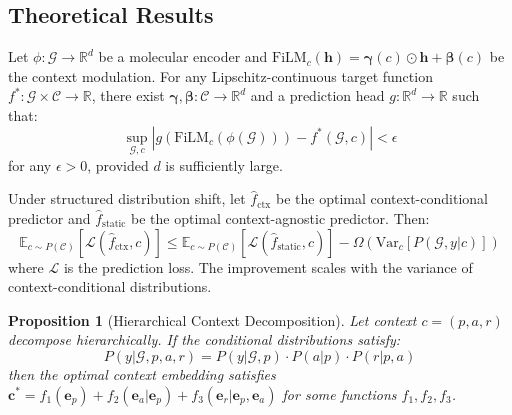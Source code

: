 \documentclass[sigconf,anonymous]{acmart}
\newtheorem{proposition}[theorem]{Proposition}
\begin{document}
\subsection{Theoretical Results}

\begin{theorem}
\label{thm:expressiveness}
Let $\phi: \mathcal{G} \rightarrow \mathbb{R}^d$ be a molecular encoder and $\text{FiLM}_c(\mathbf{h}) = \boldsymbol{\gamma}(c) \odot \mathbf{h} + \boldsymbol{\beta}(c)$ be the context modulation. For any Lipschitz-continuous target function $f^*: \mathcal{G} \times \mathcal{C} \rightarrow \mathbb{R}$, there exist $\boldsymbol{\gamma}, \boldsymbol{\beta}: \mathcal{C} \rightarrow \mathbb{R}^d$ and a prediction head $g: \mathbb{R}^d \rightarrow \mathbb{R}$ such that:
\begin{equation}
    \sup_{\mathcal{G}, c} \left| g(\text{FiLM}_c(\phi(\mathcal{G}))) - f^*(\mathcal{G}, c) \right| < \epsilon
\end{equation}
for any $\epsilon > 0$, provided $d$ is sufficiently large.
\end{theorem}

\begin{theorem}
\label{thm:benefit}
Under structured distribution shift, let $\hat{f}_{\text{ctx}}$ be the optimal context-conditional predictor and $\hat{f}_{\text{static}}$ be the optimal context-agnostic predictor. Then:
\begin{equation}
    \mathbb{E}_{c \sim P(\mathcal{C})} \left[ \mathcal{L}(\hat{f}_{\text{ctx}}, c) \right] \leq \mathbb{E}_{c \sim P(\mathcal{C})} \left[ \mathcal{L}(\hat{f}_{\text{static}}, c) \right] - \Omega\left( \text{Var}_c[P(\mathcal{G}, y | c)] \right)
\end{equation}
where $\mathcal{L}$ is the prediction loss. The improvement scales with the variance of context-conditional distributions.
\end{theorem}

\begin{proposition}[Hierarchical Context Decomposition]
\label{prop:hierarchy}
Let context $c = (p, a, r)$ decompose hierarchically. If the conditional distributions satisfy:
\begin{equation}
    P(y | \mathcal{G}, p, a, r) = P(y | \mathcal{G}, p) \cdot P(a | p) \cdot P(r | p, a)
\end{equation}
then the optimal context embedding satisfies $\mathbf{c}^* = f_1(\mathbf{e}_p) + f_2(\mathbf{e}_a | \mathbf{e}_p) + f_3(\mathbf{e}_r | \mathbf{e}_p, \mathbf{e}_a)$ for some functions $f_1, f_2, f_3$.
\end{proposition}
\end{document}
